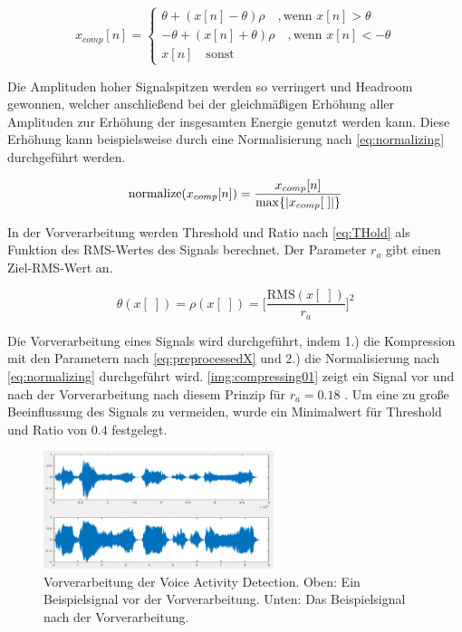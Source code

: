 \begin{equation}
x_{comp}[n] =
\begin{cases}
\theta + (x[n] - \theta) \rho \quad , \text{wenn } x[n] > \theta \\
-\theta + (x[n] + \theta) \rho \quad, \text{wenn } x[n] < -\theta \\
x[n] \quad \text{sonst}
\end{cases}
\label{eq:preprocessedX}
\end{equation}

Die Amplituden hoher Signalspitzen werden so verringert und Headroom gewonnen, welcher anschließend bei der gleichmäßigen Erhöhung aller Amplituden zur Erhöhung der insgesamten Energie genutzt werden kann. \cite[S. 400 - 401]{compressorPaper}
    Diese Erhöhung kann beispielsweise durch eine Normalisierung nach \autoref{eq:normalizing} durchgeführt werden.

\begin{equation}
\text{normalize}(x_{comp}[n]) = \frac{x_{comp}[n]}{\operatorname*{max}\{|x_{comp}[\;]|\}}
\label{eq:normalizing}
\end{equation}

In der Vorverarbeitung werden Threshold und Ratio nach \autoref{eq:THold} als Funktion des RMS-Wertes des Signals berechnet. Der Parameter $r_a$ gibt einen Ziel-RMS-Wert an.

\begin{equation}
\theta(x[\;]) = \rho(x[\;])  = \bigg[\frac{\text{RMS}(x[\;])}{r_a}\bigg]^{2}
\label{eq:THold}
\end{equation}

Die Vorverarbeitung eines Signals wird durchgeführt, indem 1.) die Kompression mit den Parametern nach \autoref{eq:preprocessedX} und 2.) die Normalisierung nach \autoref{eq:normalizing} durchgeführt wird. \autoref{img:compressing01} zeigt ein Signal vor und nach der Vorverarbeitung nach diesem Prinzip für $r_a = 0.18$ . Um eine zu große Beeinflussung des Signals zu vermeiden, wurde ein Minimalwert für Threshold und Ratio von $0.4$ festgelegt.

\begin{figure}[h]
	\centering
	\includegraphics[width=0.6\textwidth]{bilder/compressing01.png}
	\caption[Vorverarbeitung der Voice Activity Detection]{Vorverarbeitung der Voice Activity Detection. Oben: Ein Beispielsignal vor der Vorverarbeitung. Unten: Das Beispielsignal nach der Vorverarbeitung.}
	\label{img:compressing01}
\end{figure}

